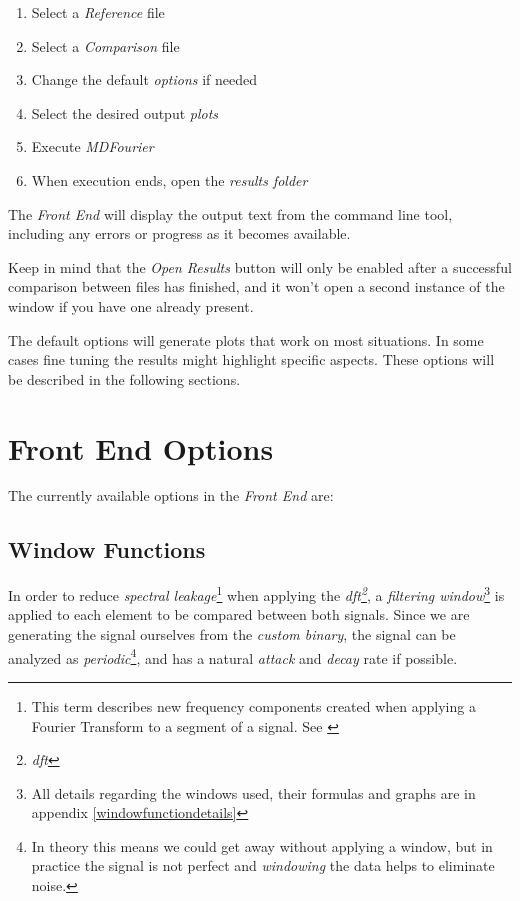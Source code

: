 \documentclass[10pt,a4paper]{report}
\newcommand{\define}[1] {
	\textit{\acrshort{#1}\footnote{\textit{\acrlong{#1}}}}}
\begin{document}
\begin{enumerate}
	\item Select a \textit{Reference} file
	\item Select a \textit{Comparison} file
	\item Change the default \textit{options} if needed
	\item Select the desired output \textit{plots}
	\item Execute \textit{MDFourier}
	\item When execution ends, open the \textit{results folder}
\end{enumerate}

The \textit{Front End} will display the output text from the command line tool, including any errors or progress as it becomes available.

Keep in mind that the \textit{Open Results} button will only be enabled after a successful comparison between files has finished, and it won't open a second instance of the window if you have one already present.

The default options will generate plots that work on most situations. In some cases fine tuning the results might highlight specific aspects. These options will be described in the following sections.

\section{Front End Options}

The currently available options in the \textit{Front End} are:

\subsection{Window Functions}
\label{windows}

In order to reduce \textit{spectral leakage}\footnote{This term describes new frequency components created when applying a Fourier Transform to a segment of a signal. See \cite{leakage}} when applying the \define{dft}, a \textit{filtering window}\footnote{All details regarding the windows used, their formulas and graphs are in appendix \ref{windowfunctiondetails}} is applied to each element to be compared between both signals. Since we are generating the signal ourselves from the \textit{custom binary}, the signal can be analyzed as \textit{periodic}\footnote{In theory this means we could get away without applying a window, but in practice the signal is not perfect and \textit{windowing} the data helps to eliminate noise.}, and has a natural \textit{attack} and \textit{decay} rate if possible.
\end{document}
